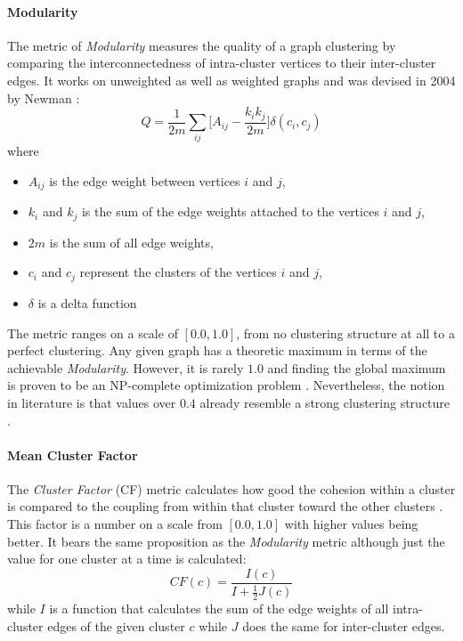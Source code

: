 \documentclass[12pt,a4paper]{report}
\begin{document}
\paragraph{Modularity}
The metric of \textit{Modularity} measures the quality
of a graph clustering by comparing the interconnectedness of intra-cluster
vertices to their inter-cluster edges. It works on unweighted as well as
weighted graphs \cite{clauset2004modularity, blondel2008modularity} and was
devised in 2004 by Newman \cite{newman2004fast}:
\[
  Q =
  \frac{1}{2m}
  \sum \limits _{ij}{\bigg[ A_{ij} - \frac{k_i k_j}{2m} \bigg]}
  \delta (c_i, c_j)
\]
where
\begin{itemize}[noitemsep]
  \item \(A_{ij}\) is the edge weight between vertices \(i\) and \(j\),
  \item \(k_i\) and \(k_j\) is the sum of the edge weights attached to
        the vertices \(i\) and \(j\),
  \item \(2m\) is the sum of all edge weights,
  \item \(c_i\) and \(c_j\) represent the clusters of the vertices \(i\) and \(j\),
  \item \(\delta\) is a delta function
\end{itemize}
The metric ranges on a scale of \([0.0, 1.0]\), from no clustering structure at
all to a perfect clustering. Any given graph has a theoretic maximum in terms
of the achievable \textit{Modularity}. However, it is rarely \(1.0\) and
finding the global maximum is proven to be an NP-complete optimization problem
\cite{brandes2006maximizing}. Nevertheless, the notion in literature is that
values over \(0.4\) already resemble a strong clustering structure
\cite{newman2004fast, fortunato2007resolution}.

\paragraph{Mean Cluster Factor}
The \textit{Cluster Factor} (CF) metric
calculates how good the cohesion within a cluster is compared to the coupling
from within that cluster toward the other clusters \cite{mitchell2006automatic}
. This factor is a number on a scale from \([0.0, 1.0]\) with higher values
being better. It bears the same proposition as the \textit{Modularity} metric
although just the value for one cluster at a time is calculated:
\[
  CF(c) = \frac{I(c)}{I + \frac{1}{2}J(c)}
\]
while $I$ is a function that calculates the
sum of the edge weights of all intra\hyp cluster edges of the given cluster $c$
while $J$ does the same for inter\hyp cluster edges.
\end{document}
